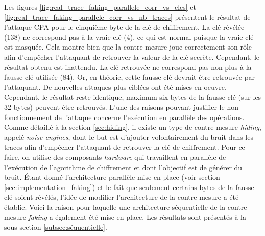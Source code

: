 \documentclass[oneside]{book}
\begin{document}
Les figures \ref{fig:real_trace_faking_parallele_corr_vs_cles} et \ref{fig:real_trace_faking_parallele_corr_vs_nb_traces} présentent le résultat de l'attaque CPA pour le cinquième byte de la clé de chiffrement. La clé révélée (138) ne correspond pas à la vraie clé (4), ce qui est normal puisque la vraie clé est masquée. Cela montre bien que la contre-mesure joue correctement son rôle afin d'empêcher l'attaquant de retrouver la valeur de la clé secrète. Cependant, le résultat obtenu est inattendu. La clé retrouvée ne correspond pas non plus à la fausse clé utilisée (84). Or, en théorie, cette fausse clé devrait être retrouvée par l'attaquant. De nouvelles attaques plus ciblées ont été mises en oeuvre. Cependant, le résultat reste identique, maximum six bytes de la fausse clé (sur les 32 bytes) peuvent être retrouvés. L'une des raisons pouvant justifier le non-fonctionnement de l'attaque concerne l'exécution en parallèle des opérations. Comme détaillé à la section \ref{sec:hiding}, il existe un type de contre-mesure \textit{hiding}, appelé \textit{noise engines}, dont le but est d'ajouter volontairement du bruit dans les traces afin d'empêcher l'attaquant de retrouver la clé de chiffrement. Pour ce faire, on utilise des composants \textit{hardware} qui travaillent en parallèle de l'exécution de l'agorithme de chiffrement et dont l'objectif est de générer du bruit. Étant donné l'architecture parallèle mise en place (voir section \ref{sec:implementation_faking}) et le fait que seulement certains bytes de la fausse clé soient révélés, l'idée de modifier l'architecture de la contre-mesure a été établie. Voici la raison pour laquelle une architecture séquentielle de la contre-mesure \textit{faking} a également été mise en place. Les résultats sont présentés à la sous-section \ref{subsec:séquentielle}.
\end{document}
